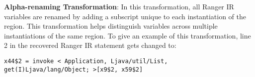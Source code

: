 \textbf{Alpha-renaming Transformation}: In this transformation, all Ranger IR variables are renamed by adding a subscript
unique to each instantiation of the region.
%
This transformation helps distinguish variables across multiple instantiations of the same region.
%
%
To give an example of this transformation, line 2 in the recovered Ranger IR statement gets changed to:
\begin{lstlisting}[numbers=none]
x44$2 = invoke < Application, Ljava/util/List, get(I)Ljava/lang/Object; >[x9$2, x59$2]
\end{lstlisting}

